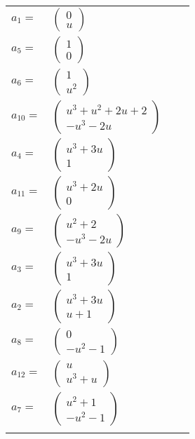 \documentclass[1p]{elsarticle_modified}
\theoremstyle{definition}
\begin{document}
\begin{tabular}{m{7pt} m{180pt} m{7pt} m{180pt} }
\flushright $a_{1}=$&$\begin{pmatrix}0\\u\end{pmatrix}$ \\
\flushright $a_{5}=$&$\begin{pmatrix}1\\0\end{pmatrix}$ \\
\flushright $a_{6}=$&$\begin{pmatrix}1\\u^2\end{pmatrix}$ \\
\flushright $a_{10}=$&$\begin{pmatrix}u^3+u^2+2 u+2\\- u^3-2 u\end{pmatrix}$ \\
\flushright $a_{4}=$&$\begin{pmatrix}u^3+3 u\\1\end{pmatrix}$ \\
\flushright $a_{11}=$&$\begin{pmatrix}u^3+2 u\\0\end{pmatrix}$ \\
\flushright $a_{9}=$&$\begin{pmatrix}u^2+2\\- u^3-2 u\end{pmatrix}$ \\
\flushright $a_{3}=$&$\begin{pmatrix}u^3+3 u\\1\end{pmatrix}$ \\
\flushright $a_{2}=$&$\begin{pmatrix}u^3+3 u\\u+1\end{pmatrix}$ \\
\flushright $a_{8}=$&$\begin{pmatrix}0\\- u^2-1\end{pmatrix}$ \\
\flushright $a_{12}=$&$\begin{pmatrix}u\\u^3+u\end{pmatrix}$ \\
\flushright $a_{7}=$&$\begin{pmatrix}u^2+1\\- u^2-1\end{pmatrix}$\\&\end{tabular}
\end{document}

